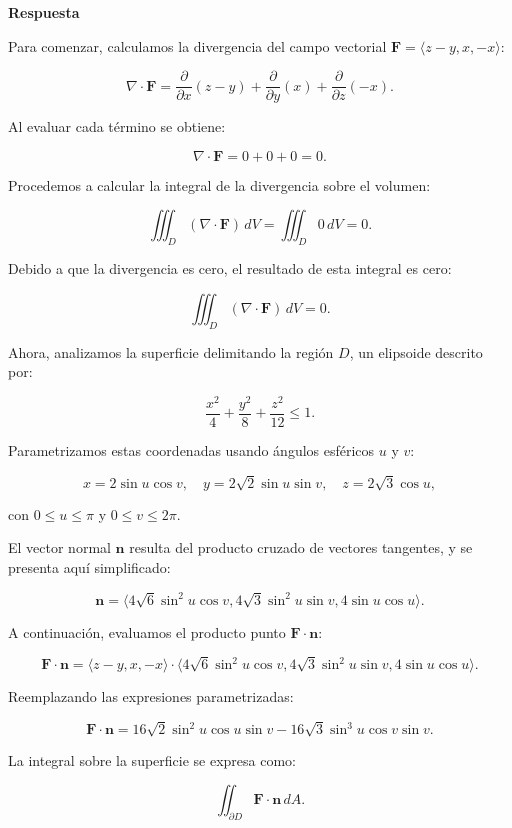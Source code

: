 \documentclass{report}
\begin{document}
\textbf{Respuesta}

Para comenzar, calculamos la divergencia del campo vectorial \( \mathbf{F} = \langle z-y, x, -x \rangle \):

\[
\nabla \cdot \mathbf{F} = \frac{\partial}{\partial x}(z-y) + \frac{\partial}{\partial y}(x) + \frac{\partial}{\partial z}(-x).
\]

Al evaluar cada término se obtiene:

\[
\nabla \cdot \mathbf{F} = 0 + 0 + 0 = 0.
\]

Procedemos a calcular la integral de la divergencia sobre el volumen:

\[
\iiint_D (\nabla \cdot \mathbf{F}) \, dV = \iiint_D 0 \, dV = 0.
\]

Debido a que la divergencia es cero, el resultado de esta integral es cero:

\[
\iiint_D (\nabla \cdot \mathbf{F}) \, dV = 0.
\]

Ahora, analizamos la superficie delimitando la región \( D \), un elipsoide descrito por:

\[
\frac{x^2}{4} + \frac{y^2}{8} + \frac{z^2}{12} \leq 1.
\]

Parametrizamos estas coordenadas usando ángulos esféricos \( u \) y \( v \):

\[
x = 2 \sin u \cos v, \quad y = 2\sqrt{2} \sin u \sin v, \quad z = 2\sqrt{3} \cos u,
\]

con \( 0 \leq u \leq \pi \) y \( 0 \leq v \leq 2\pi \).

El vector normal \( \mathbf{n} \) resulta del producto cruzado de vectores tangentes, y se presenta aquí simplificado:

\[
\mathbf{n} = \langle 4\sqrt{6} \sin^2 u \cos v, 4\sqrt{3} \sin^2 u \sin v, 4 \sin u \cos u \rangle.
\]

A continuación, evaluamos el producto punto \( \mathbf{F} \cdot \mathbf{n} \):

\[
\mathbf{F} \cdot \mathbf{n} = \langle z-y, x, -x \rangle \cdot \langle 4\sqrt{6} \sin^2 u \cos v, 4\sqrt{3} \sin^2 u \sin v, 4 \sin u \cos u \rangle.
\]

Reemplazando las expresiones parametrizadas:

\[
\mathbf{F} \cdot \mathbf{n} = 16\sqrt{2} \sin^2 u \cos u \sin v - 16\sqrt{3} \sin^3 u \cos v \sin v.
\]

La integral sobre la superficie se expresa como:

\[
\iint_{\partial D} \mathbf{F} \cdot \mathbf{n} \, dA.
\]
\end{document}
